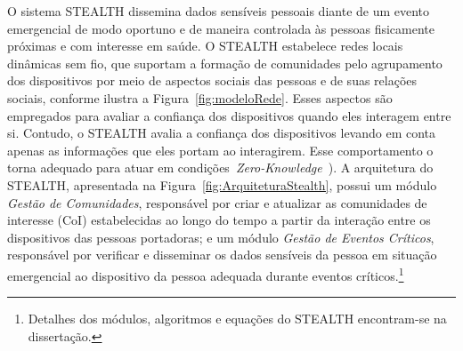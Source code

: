\documentclass[12pt]{article}
\begin{document}
O sistema \mbox{STEALTH} dissemina dados sensíveis pessoais diante de um evento emergencial de modo oportuno e de maneira controlada às pessoas fisicamente próximas e com interesse em saúde. O \mbox{STEALTH} estabelece redes locais dinâmicas sem fio, que suportam a formação de comunidades pelo agrupamento dos dispositivos por meio de aspectos sociais das pessoas e de suas relações sociais, conforme ilustra a Figura~\ref{fig:modeloRede}. Esses aspectos são empregados para avaliar a confiança dos dispositivos quando eles interagem entre si. 
Contudo, o \mbox{STEALTH} avalia a confiança dos dispositivos levando em conta apenas as informações que eles portam ao interagirem. Esse comportamento o torna adequado para atuar em condições~\textit{Zero-Knowledge}~\cite{kim2015hcs}).
A arquitetura do \mbox{STEALTH}, apresentada na Figura~\ref{fig:ArquiteturaStealth}, possui um módulo {\it Gestão de Comunidades}, responsável por criar e atualizar as comunidades de interesse (CoI) estabelecidas ao longo do tempo a partir da interação entre os dispositivos das pessoas portadoras; e um módulo {\it Gestão de Eventos Críticos}, responsável por verificar e disseminar os dados sensíveis da pessoa em situação emergencial ao dispositivo da pessoa adequada durante eventos críticos.\footnote{Detalhes dos módulos, algoritmos e equações do  \mbox{STEALTH} encontram-se na dissertação.}
\end{document}
